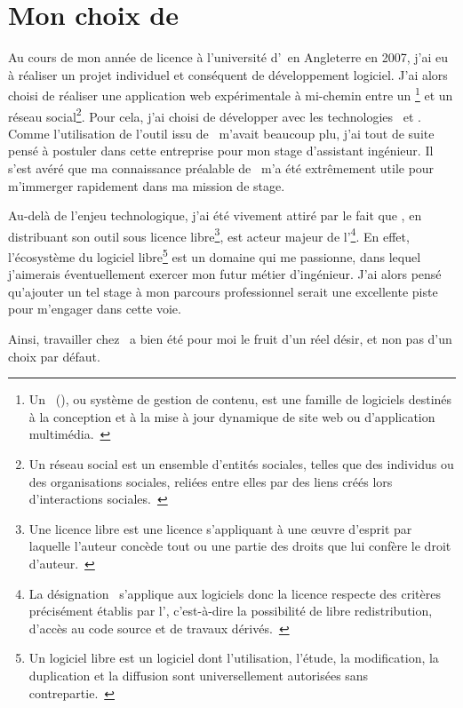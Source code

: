 \section{Mon choix de \asl}

Au cours de mon année de licence à l'université d'\abrookes\ en Angleterre en 2007, j'ai eu à réaliser un projet individuel et conséquent de développement logiciel. J'ai alors choisi de réaliser une application web expérimentale à mi-chemin entre un \acms\footnote{Un \acms\ (\acmsfull), ou système de gestion de contenu, est une famille de logiciels destinés à la conception et à la mise à jour dynamique de site web ou d'application multimédia.~\cite{cms}} et un réseau social\footnote{Un réseau social est un ensemble d'entités sociales, telles que des individus ou des organisations sociales, reliées entre elles par des liens créés lors d'interactions sociales.~\cite{reseausocial}}. Pour cela, j'ai choisi de développer avec les technologies \aphp\ et \asf. Comme l'utilisation de l'outil issu de \asl\ m'avait beaucoup plu, j'ai tout de suite pensé à postuler dans cette entreprise pour mon stage d'assistant ingénieur. Il s'est avéré que ma connaissance préalable de \asf\ m'a été extrêmement utile pour m'immerger rapidement dans ma mission de stage.

Au-delà de l'enjeu technologique, j'ai été vivement attiré par le fait que \asl, en distribuant son outil sous licence libre\footnote{Une licence libre est une licence s'appliquant à une œuvre d'esprit par laquelle l'auteur concède tout ou une partie des droits que lui confère le droit d'auteur.~\cite{licencelibre}}, est acteur majeur de l'\aos\footnote{La désignation \aos\ s'applique aux logiciels donc la licence respecte des critères précisément établis par l'\aosinitiative, c'est-à-dire la possibilité de libre redistribution, d'accès au code source et de travaux dérivés.~\cite{os}}. En effet, l'écosystème du logiciel libre\footnote{Un logiciel libre est un logiciel dont l'utilisation, l'étude, la modification, la duplication et la diffusion sont universellement autorisées sans contrepartie.~\cite{logiciellibre}} est un domaine qui me passionne, dans lequel j'aimerais éventuellement exercer mon futur métier d'ingénieur. J'ai alors pensé qu'ajouter un tel stage à mon parcours professionnel serait une excellente piste pour m'engager dans cette voie.

Ainsi, travailler chez \asl\ a bien été pour moi le fruit d'un réel désir, et non pas d'un choix par défaut.
